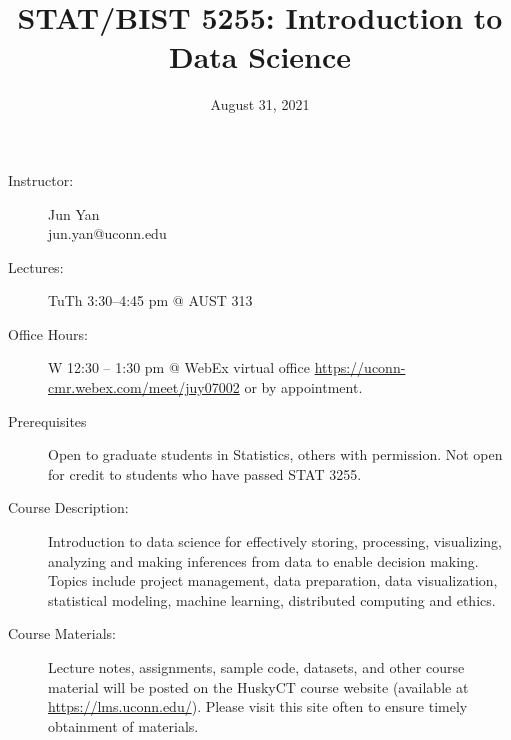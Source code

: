 \documentclass[twocolumn]{article}
\newcommand{\jy}[1]{\textcolor{red}{Updated: (#1)}}
\begin{document}

\title{STAT/BIST 5255: Introduction to Data Science}
\date{August 31, 2021}

\maketitle

\thispagestyle{fancy}

\begin{description}
\item[Instructor:]
  Jun Yan\\
  jun.yan@uconn.edu

\item[Lectures:] 
  TuTh 3:30--4:45 pm @ AUST 313
  

\item[Office Hours:] 
  W 12:30 -- 1:30 pm @ WebEx virtual office
  \url{https://uconn-cmr.webex.com/meet/juy07002}
  or by appointment.

  
\item[Prerequisites]
  Open to graduate students in Statistics, others with permission. Not
  open for credit to students who have passed STAT 3255.
    
\item[Course Description:]
  Introduction to data science for effectively storing, processing,
  visualizing, analyzing and making inferences from data to enable
  decision making. Topics include project management, data
  preparation, data visualization, statistical modeling, machine
  learning, distributed computing and ethics.
  
\item[Course Materials:]
  Lecture notes, assignments, sample code, datasets,  and other course material will be posted
  on the HuskyCT course website (available at \url{https://lms.uconn.edu/}).
  Please visit this site often to ensure timely obtainment of materials.
  

\end{description}
\end{document}
